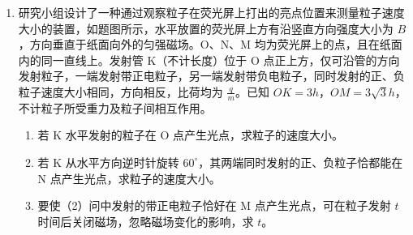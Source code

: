 \documentclass[\gkver]{gaokaozhenti}
\begin{document}
\begin{enumerate}
{可得 $p_{0}' = \frac{p_{2}S + mg}{S} = \frac{p}{2} + \frac{mg}{S}$

（3）根据平行板电容器的决定式 $C = \frac{\varepsilon S}{4\pi kd}$，变化后间距为 $2d$，其他条件均不变

可知电容器的电容变为初始时的 $\frac{1}{2}$。
}

\item
研究小组设计了一种通过观察粒子在荧光屏上打出的亮点位置来测量粒子速度大小的装置，如题图所示，水平放置的荧光屏上方有沿竖直方向强度大小为 $B$，方向垂直于纸面向外的匀强磁场。O、N、M 均为荧光屏上的点，且在纸面内的同一直线上。发射管 K（不计长度）位于 O 点正上方，仅可沿管的方向发射粒子，一端发射带正电粒子，另一端发射带负电粒子，同时发射的正、负粒子速度大小相同，方向相反，比荷均为 $\frac{q}{m}$。已知 $OK = 3h$，$OM = 3\sqrt{3}h$，不计粒子所受重力及粒子间相互作用。
\begin{enumerate}
	\item
	若 K 水平发射的粒子在 O 点产生光点，求粒子的速度大小。
	\item
	若 K 从水平方向逆时针旋转 $60^\circ$，其两端同时发射的正、负粒子恰都能在 N 点产生光点，求粒子的速度大小。
	\item
	要使（2）问中发射的带正电粒子恰好在 M 点产生光点，可在粒子发射 $t$ 时间后关闭磁场，忽略磁场变化的影响，求 $t$。
\end{enumerate}


\end{enumerate}
\end{document}
